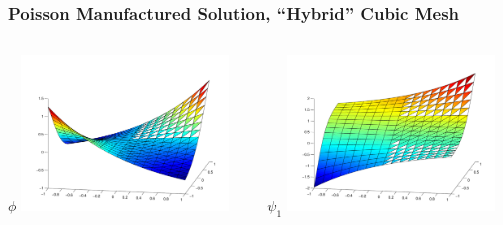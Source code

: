 \documentclass[mathserif]{beamer}
\begin{document}
\begin{frame}
\frametitle{Poisson Manufactured Solution, ``Hybrid'' Cubic Mesh}
\begin{columns}[c]
\begin{column}{5.5cm}
\begin{block}{$\phi$}
\includegraphics[width=5.5cm]{phicubic16x16}
\end{block}
\end{column}
\begin{column}{5.5cm}
\begin{block}{$\psi_{1}$}
\includegraphics[width=5.5cm]{psi1cubic16x16}
\end{block}
\end{column}
\end{columns}
\end{frame}
\end{document}
